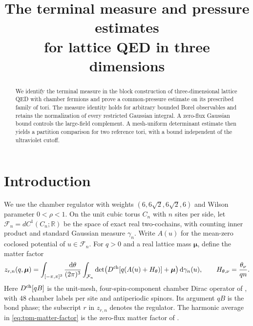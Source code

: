 \documentclass[11pt,letterpaper,reqno]{amsart}
\title[Terminal measure and pressure for lattice QED]{The terminal measure and pressure estimates\\
for lattice QED in three dimensions}
\date{}
\newcommand{\R}{\mathbb R}
\newcommand{\dd}{\mathrm d}
\begin{document}
\begin{abstract}
We identify the terminal measure in the block construction of
three-dimensional lattice QED with chamber fermions and prove
a common-pressure estimate on its prescribed family of tori.
The measure identity holds for arbitrary bounded Borel
observables and retains the normalization of every restricted
Gaussian integral. A zero-flux Gaussian bound controls the
large-field complement. A mesh-uniform determinant estimate
then yields a partition comparison for two reference tori,
with a bound independent of the ultraviolet cutoff.
\end{abstract}
\maketitle
\tableofcontents

\section{Introduction}

We use the chamber regulator with weights $(6,6\sqrt2,6\sqrt2,6)$
and Wilson parameter $0<\rho<1$. On the unit cubic torus $C_n$
with $n$ sites per side, let
$\mathcal F_n=dC^1(C_n;\R)$ be the space of exact real two-cochains,
with counting inner product and standard Gaussian measure $\gamma_n$.
Write $A(u)$ for the mean-zero coclosed potential of $u\in\mathcal F_n$.
For $q>0$ and a real lattice mass $\boldsymbol\mu$, define the matter factor
\begin{equation}\label{eq:tpm-matter-factor}
 z_{r,n}(q,\boldsymbol\mu)=
 \int_{[-\pi,\pi]^3}\frac{\dd\theta}{(2\pi)^3}
 \int_{\mathcal F_n}
 \det\bigl(D^{\rm ch}[q(A(u)+H_\theta)]+\boldsymbol\mu\bigr)
 \,\dd\gamma_n(u),\qquad
 H_{\theta,\nu}=\frac{\theta_\nu}{qn}.
\end{equation}
Here $D^{\rm ch}[qB]$ is the unit-mesh, four-spin-component
chamber Dirac operator of \cite[\S2]{ChamberLattice}, with $48$
chamber labels per site and antiperiodic spinors. Its argument $qB$
is the bond phase; the subscript $r$ in $z_{r,n}$ denotes the regulator.
The harmonic average in \eqref{eq:tpm-matter-factor} is the
zero-flux matter factor of \cite[(37)--(40)]{ReferenceResponse}.
\end{document}
